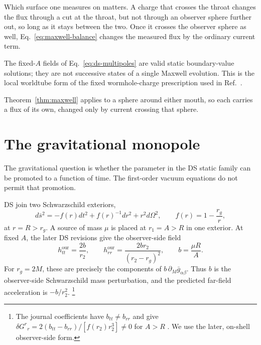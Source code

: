 \documentclass[aps,prd,10pt,onecolumn,nofootinbib,superscriptaddress,floatfix]{revtex4-2}
\begin{document}
Which surface one measures on matters.  A charge that crosses the throat
changes the flux through a cut at the throat, but not through an observer
sphere further out, so long as it stays between the two.  Once it crosses the
observer sphere as well, Eq.~\eqref{eq:maxwell-balance} changes the measured
flux by the ordinary current term.

The fixed-$A$ fields of Eq.~\eqref{eq:ds-multipoles} are valid static
boundary-value solutions; they are not successive states of a single Maxwell
evolution.  This is the local worldtube form of the fixed wormhole-charge
prescription used in Ref.~\cite{Krasnikov2008ElectrostaticInteraction}.

Theorem~\ref{thm:maxwell} applies to a sphere around either mouth, so each
carries a flux of its own, changed only by current crossing that sphere.

\FloatBarrier

\section{The gravitational monopole}
\label{sec:ds-model}

The gravitational question is whether the parameter in the DS static family
can be promoted to a function of time.  The first-order vacuum equations do
not permit that promotion.

DS join two Schwarzschild exteriors,
\begin{equation}
  d\bar s^2=-f(r)dt^2+f(r)^{-1}dr^2+r^2d\Omega^2,
  \qquad f(r)=1-\frac{r_g}{r},
  \label{eq:background}
\end{equation}
at $r=R>r_g$.  A source of mass $\mu$ is placed at $r_1=A>R$ in one
exterior.  At fixed $A$, the later DS revisions give the observer-side field
\cite{DaiStojkovic2019ObservingV2,DaiStojkovic2019ObservingV3}
\begin{equation}
  h^{\mathrm{our}}_{tt}=\frac{2b}{r_2},
  \qquad
  h^{\mathrm{our}}_{rr}=\frac{2b r_2}{(r_2-r_g)^2},
  \qquad
  b=\frac{\mu R}{A}.
  \label{eq:ds-observer-mode}
\end{equation}
For $r_g=2M$, these are precisely the components of
$b\,\partial_M\bar g_{\alpha\beta}$.  Thus $b$ is the observer-side
Schwarzschild mass perturbation, and the predicted far-field acceleration is
$-b/r_2^2$.%
\footnote{The journal coefficients have $b_{tt}\ne b_{rr}$ and give
$\delta G^{r}{}_{r}=2(b_{tt}-b_{rr})/[f(r_2)r_2^3]\ne0$ for $A>R$
\cite{DaiStojkovic2019Observing}.  We use the later, on-shell observer-side
form.}
\end{document}
